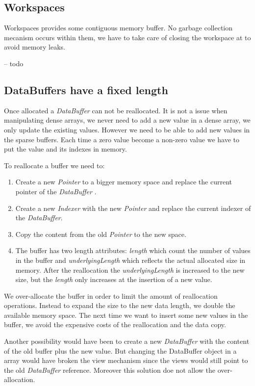 \subsection{Workspaces}

Workspaces provides some contiguous memory buffer. No garbage collection mecanism occurs within them, we have to take care of closing the workspace at to avoid memory leaks. 

-- todo


\subsection{DataBuffers have a fixed length}

Once allocated a \textit{DataBuffer} can not be reallocated. It is not a issue when manipulating dense arrays, we never need to add a new value in a dense array, we only update the existing values. However we need to be able to add new values in the sparse buffers. Each time a zero value become a non-zero value we have to put the value and its indexes in memory.

To reallocate a buffer we need to:
\begin{enumerate}
	\item Create a new \textit{Pointer} to a bigger memory space and replace the current pointer of the \textit{DataBuffer} .
	\item Create a new \textit{Indexer} with the new \textit{Pointer} and replace the current indexer of the \textit{DataBuffer}.
	\item Copy the content from the old \textit{Pointer} to the new space.
	\item The buffer has two length attributes: \textit{length} which count the number of values in the buffer and \textit{underlyingLength} which reflects the actual allocated size in memory. After the reallocation the \textit{underlyingLength} is increased to the new size, but the \textit{length} only increases at the insertion of a new value.
\end{enumerate}

We over-allocate the buffer in order to limit the amount of reallocation operations. Instead to expand the size to the new data length, we double the available memory space. The next time we want to insert some new values in the buffer, we avoid the expensive costs of the reallocation and the data copy.

Another possibility would have been to create a new \textit{DataBuffer} with the content of the old buffer plus the new value. But changing the DataBuffer object in a array would have broken the view mechanism since the views would still point to the old \textit{DataBuffer} reference. Moreover this solution doe not allow the over-allocation.


